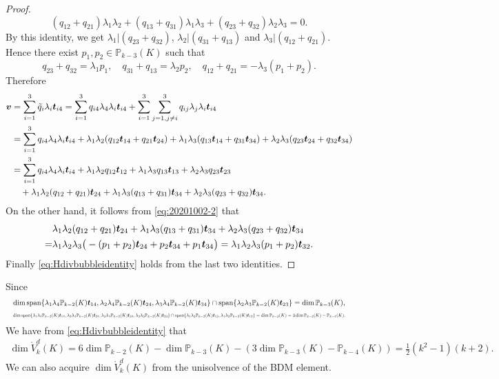 \begin{proof}
\[
(q_{12}+q_{21})\lambda_1\lambda_2+(q_{13}+q_{31})\lambda_1\lambda_3+(q_{23}+q_{32})\lambda_2\lambda_3=0.
\]
By this identity, we get $\lambda_1|(q_{23}+q_{32})$, $\lambda_2|(q_{31}+q_{13})$ and $\lambda_3|(q_{12}+q_{21})$.
Hence there exist $p_1, p_2\in \mathbb P_{k-3}(K)$ such that
\begin{equation}\label{eq:20201002-2}
q_{23}+q_{32}=\lambda_1p_1, \quad q_{31}+q_{13}=\lambda_2p_2, \quad q_{12}+q_{21}=-\lambda_3(p_1+p_2).
\end{equation}
Therefore
\begin{align*}
\boldsymbol v&=\sum_{i=1}^3\tilde q_i\lambda_i\boldsymbol t_{i4} =\sum_{i=1}^3q_{i4}\lambda_4\lambda_i\boldsymbol t_{i4} + \sum_{i=1}^3\sum_{j=1, j\neq i}^3q_{ij}\lambda_j\lambda_i\boldsymbol t_{i4}  \\
&=\sum_{i=1}^3q_{i4}\lambda_4\lambda_i\boldsymbol t_{i4} + \lambda_1\lambda_2(q_{12}\boldsymbol t_{14}+q_{21}\boldsymbol t_{24}) + \lambda_1\lambda_3(q_{13}\boldsymbol t_{14}+q_{31}\boldsymbol t_{34}) + \lambda_2\lambda_3(q_{23}\boldsymbol t_{24}+q_{32}\boldsymbol t_{34}) \\
&=\sum_{i=1}^3q_{i4}\lambda_4\lambda_i\boldsymbol t_{i4}  + \lambda_1\lambda_2q_{12}\boldsymbol t_{12} + \lambda_1\lambda_3q_{13}\boldsymbol t_{13}  + \lambda_2\lambda_3q_{23}\boldsymbol t_{23}\\
&\quad + \lambda_1\lambda_2(q_{12}+q_{21})\boldsymbol t_{24} + \lambda_1\lambda_3(q_{13}+q_{31})\boldsymbol t_{34}+ \lambda_2\lambda_3(q_{23}+q_{32})\boldsymbol t_{34}. 
\end{align*}
On the other hand, it follows from \eqref{eq:20201002-2} that
\begin{align*}
&\lambda_1\lambda_2(q_{12}+q_{21})\boldsymbol t_{24} + \lambda_1\lambda_3(q_{13}+q_{31})\boldsymbol t_{34}+ \lambda_2\lambda_3(q_{23}+q_{32})\boldsymbol t_{34} \\
=&\lambda_1\lambda_2\lambda_3\big(-(p_1+p_2)\boldsymbol t_{24} +p_2\boldsymbol t_{34}+p_1\boldsymbol t_{34} \big)=\lambda_1\lambda_2\lambda_3(p_1+p_2)\boldsymbol t_{32}.
\end{align*}
Finally \eqref{eq:Hdivbubbleidentity} holds from the last two identities.
\end{proof}


Since
\[
\resizebox{\textwidth}{!}{$ %
\dim\textrm{span}\{\lambda_1\lambda_4\mathbb P_{k-2}(K)\bs t_{14}, \lambda_2\lambda_4\mathbb P_{k-2}(K)\bs t_{24}, \lambda_3\lambda_4\mathbb P_{k-2}(K)\bs t_{34}\}\cap\textrm{span}\{\lambda_2\lambda_3\mathbb P_{k-2}(K)\bs t_{23}\}=\dim\mathbb P_{k-3}(K), 
$}
\]
\[
\resizebox{\textwidth}{!}{$ %
\dim\textrm{span}\{\lambda_1\lambda_4\mathbb P_{k-2}(K)\bs t_{14}, \lambda_2\lambda_4\mathbb P_{k-2}(K)\bs t_{24}, \lambda_3\lambda_4\mathbb P_{k-2}(K)\bs t_{34}, \lambda_2\lambda_3\mathbb P_{k-2}(K)\bs t_{23}\}\cap\textrm{span}\{\lambda_1\lambda_3\mathbb P_{k-2}(K)\bs t_{13}, \lambda_1\lambda_2\mathbb P_{k-2}(K)\bs t_{12}\}=\dim\mathbb P_{k-3}(K) = 3\dim\mathbb P_{k-3}(K)-\mathbb P_{k-4}(K), 
$}
\]
We have from \eqref{eq:Hdivbubbleidentity} that
\begin{align*}
\dim\mathring V_{k}^d(K)=6\dim\mathbb P_{k-2}(K)-\dim\mathbb P_{k-3}(K)-(3\dim\mathbb P_{k-3}(K)-\mathbb P_{k-4}(K))=\frac{1}{2}(k^2-1)(k+2).
\end{align*}
We can also acquire $\dim\mathring V_{k}^d(K)$ from the unisolvence of the BDM element.


